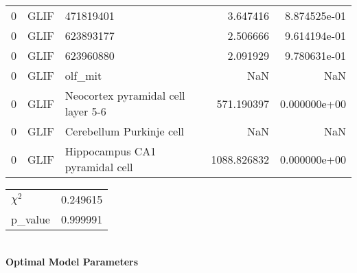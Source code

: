 \begin{tabular}{lllrr}
0 &        GLIF &                           471819401 &     3.647416 &  8.874525e-01 \\
0 &        GLIF &                           623893177 &     2.506666 &  9.614194e-01 \\
0 &        GLIF &                           623960880 &     2.091929 &  9.780631e-01 \\
0 &        GLIF &                             olf\_mit &          NaN &           NaN \\
0 &        GLIF &  Neocortex pyramidal cell layer 5-6 &   571.190397 &  0.000000e+00 \\
0 &        GLIF &            Cerebellum Purkinje cell &          NaN &           NaN \\
0 &        GLIF &      Hippocampus CA1 pyramidal cell &  1088.826832 &  0.000000e+00 \\
\bottomrule
\end{tabular}




\begin{tabular}{lr}
\toprule
$\chi^{2}$ &  0.249615 \\
p\_value    &  0.999991 \\
\bottomrule
\end{tabular}
\\
\newline
\textbf{Optimal Model Parameters}
\newline
\begin{table}[ht]
\centering
{}
\end{table} 

\begin{table}[ht]
\centering
{}
\end{table} 

